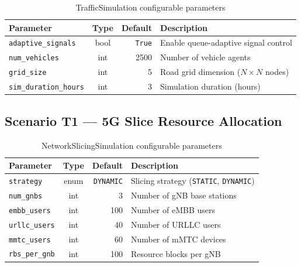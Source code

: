 \begin{table}[h]
    \centering
    \caption{TrafficSimulation configurable parameters}
    \label{tab:params-m1}
    \small
    \begin{tabular}{|l|c|r|p{6cm}|}
        \hline
        \textbf{Parameter} & \textbf{Type} & \textbf{Default} & \textbf{Description} \\
        \hline
        \texttt{adaptive\_signals}      & bool & \texttt{True} & Enable queue-adaptive signal control \\
        \hline
        \texttt{num\_vehicles}          & int  & 2500  & Number of vehicle agents \\
        \hline
        \texttt{grid\_size}             & int  & 5     & Road grid dimension ($N \times N$ nodes) \\
        \hline
        \texttt{sim\_duration\_hours}   & int  & 3     & Simulation duration (hours) \\
        \hline
    \end{tabular}
\end{table}

\subsection*{Scenario T1 --- 5G Slice Resource Allocation}

\begin{table}[h]
    \centering
    \caption{NetworkSlicingSimulation configurable parameters}
    \label{tab:params-t1}
    \small
    \begin{tabular}{|l|c|r|p{6cm}|}
        \hline
        \textbf{Parameter} & \textbf{Type} & \textbf{Default} & \textbf{Description} \\
        \hline
        \texttt{strategy}       & enum & \texttt{DYNAMIC} & Slicing strategy (\texttt{STATIC}, \texttt{DYNAMIC}) \\
        \hline
        \texttt{num\_gnbs}      & int  & 3   & Number of gNB base stations \\
        \hline
        \texttt{embb\_users}    & int  & 100 & Number of eMBB users \\
        \hline
        \texttt{urllc\_users}   & int  & 40  & Number of URLLC users \\
        \hline
        \texttt{mmtc\_users}    & int  & 60  & Number of mMTC devices \\
        \hline
        \texttt{rbs\_per\_gnb}  & int  & 100 & Resource blocks per gNB \\
        \hline
    \end{tabular}
\end{table}

